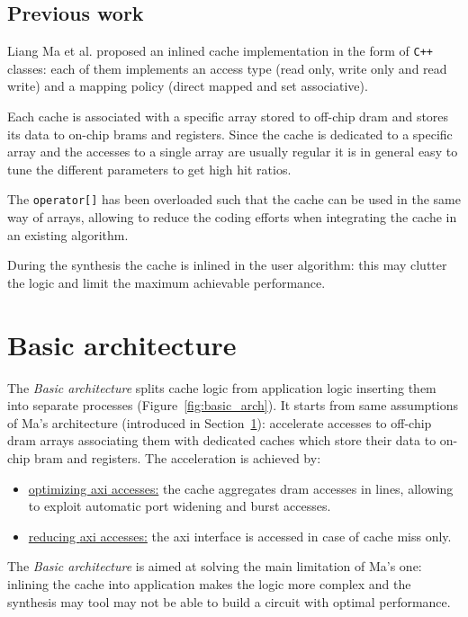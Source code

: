 \documentclass[11pt,a4paper,oneside]{memoir}
\begin{document}
\section{Previous work}\label{sec:liang}
Liang Ma et al. proposed an inlined cache implementation \cite{liang} in the
form of \texttt{C++} classes: each of them implements an access type (read
only, write only and read write) and a mapping policy (direct mapped and set
associative).

Each cache is associated with a specific array stored to off-chip \ac{dram} and
stores its data to on-chip \acp{bram} and registers. Since the cache is
dedicated to a specific array and the accesses to a single array are usually
regular it is in general easy to tune the different parameters to get high hit
ratios.

The \texttt{operator[]} has been overloaded such that the cache can be used in
the same way of arrays, allowing to reduce the coding efforts when integrating
the cache in an existing algorithm.

During the synthesis the cache is inlined in the user algorithm: this may
clutter the logic and limit the maximum achievable performance.

\chapter{Basic architecture}
The \emph{Basic architecture} splits cache logic from application logic
inserting them into separate processes (Figure~\ref{fig:basic_arch}).
It starts from same assumptions of Ma's architecture (introduced in
Section~\ref{sec:liang}): accelerate accesses to off-chip \ac{dram} arrays
associating them with dedicated caches which store their data to on-chip
\ac{bram} and registers.
The acceleration is achieved by:
\begin{itemize}
	\item \underline{optimizing \ac{axi} accesses:} the cache aggregates
		\ac{dram} accesses in lines, allowing to exploit automatic port
		widening and burst accesses.
	\item \underline{reducing \ac{axi} accesses:} the \ac{axi} interface is
		accessed in case of cache miss only.
\end{itemize}

The \emph{Basic architecture} is aimed at solving the main limitation of Ma's
one: inlining the cache into application makes the logic more complex and the
synthesis may tool may not be able to build a circuit with optimal performance.
\end{document}
